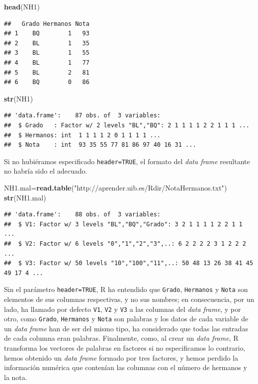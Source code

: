 \documentclass[]{book}
\newenvironment{Shaded}{\begin{snugshade}}{\end{snugshade}}
\newcommand{\KeywordTok}[1]{\textcolor[rgb]{0.13,0.29,0.53}{\textbf{#1}}}
\newcommand{\NormalTok}[1]{#1}
\newcommand{\StringTok}[1]{\textcolor[rgb]{0.31,0.60,0.02}{#1}}
\theoremstyle{definition}
\theoremstyle{definition}
\theoremstyle{definition}
\theoremstyle{remark}
\begin{document}
\begin{Shaded}
\begin{Highlighting}[]
\KeywordTok{head}\NormalTok{(NH1)}
\end{Highlighting}
\end{Shaded}

\begin{verbatim}
##   Grado Hermanos Nota
## 1    BQ        1   93
## 2    BL        1   35
## 3    BL        1   55
## 4    BL        1   77
## 5    BL        2   81
## 6    BQ        0   86
\end{verbatim}

\begin{Shaded}
\begin{Highlighting}[]
\KeywordTok{str}\NormalTok{(NH1)}
\end{Highlighting}
\end{Shaded}

\begin{verbatim}
## 'data.frame':    87 obs. of  3 variables:
##  $ Grado   : Factor w/ 2 levels "BL","BQ": 2 1 1 1 1 2 2 1 1 1 ...
##  $ Hermanos: int  1 1 1 1 2 0 1 1 1 1 ...
##  $ Nota    : int  93 35 55 77 81 86 97 40 16 31 ...
\end{verbatim}

Si no hubiéramos especificado \texttt{header=TRUE}, el formato del \emph{data frame} resultante no habría sido el adecuado.

\begin{Shaded}
\begin{Highlighting}[]
\NormalTok{NH1.mal=}\KeywordTok{read.table}\NormalTok{(}\StringTok{"http://aprender.uib.es/Rdir/NotaHermanos.txt"}\NormalTok{)}
\KeywordTok{str}\NormalTok{(NH1.mal)}
\end{Highlighting}
\end{Shaded}

\begin{verbatim}
## 'data.frame':    88 obs. of  3 variables:
##  $ V1: Factor w/ 3 levels "BL","BQ","Grado": 3 2 1 1 1 1 2 2 1 1 ...
##  $ V2: Factor w/ 6 levels "0","1","2","3",..: 6 2 2 2 2 3 1 2 2 2 ...
##  $ V3: Factor w/ 50 levels "10","100","11",..: 50 48 13 26 38 41 45 49 17 4 ...
\end{verbatim}

Sin el parámetro \texttt{header=TRUE}, R ha entendido que \texttt{Grado}, \texttt{Hermanos} y \texttt{Nota} son elementos de sus columnas respectivas, y no sus nombres; en consecuencia, por un lado, ha llamado por defecto \texttt{V1}, \texttt{V2} y \texttt{V3} a las columnas del \emph{data frame}, y por otro, como \texttt{Grado}, \texttt{Hermanos} y \texttt{Nota} son palabras y los datos de cada variable de un \emph{data frame} han de ser del mismo tipo, ha considerado que todas las entradas de cada columna eran palabras. Finalmente, como, al crear un \emph{data frame}, R transforma los vectores de palabras en factores si no especificamos lo contrario, hemos obtenido un \emph{data frame} formado por tres factores, y hemos perdido la información numérica que contenían las columnas con el número de hermanos y la nota.
\end{document}
